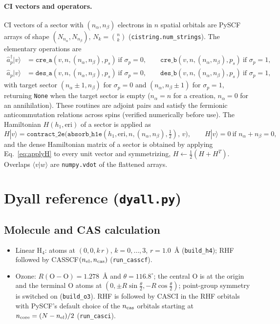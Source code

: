 \documentclass[11pt,a4paper]{article}
\newcommand{\ket}[1]{|#1\rangle}
\newcommand{\braket}[1]{\langle#1\rangle}
\newcommand{\code}[1]{\texttt{#1}}
\begin{document}
\paragraph{CI vectors and operators.}
CI vectors of a sector with $(n_\alpha,n_\beta)$ electrons in $n$ spatial
orbitals are PySCF arrays of shape $(N_{n_\alpha},N_{n_\beta})$,
$N_k=\binom{n}{k}$ (\code{cistring.num\_strings}).  The elementary
operations are
\begin{align}
  \hat a_p^\dagger\ket{v}&=\code{cre\_a}(v,n,(n_\alpha,n_\beta),p_s)\ \text{if }\sigma_p=0,\qquad
  \code{cre\_b}(v,n,(n_\alpha,n_\beta),p_s)\ \text{if }\sigma_p=1,
  \label{eq:cre}\\
  \hat a_p\ket{v}&=\code{des\_a}(v,n,(n_\alpha,n_\beta),p_s)\ \text{if }\sigma_p=0,\qquad
  \code{des\_b}(v,n,(n_\alpha,n_\beta),p_s)\ \text{if }\sigma_p=1,
  \label{eq:des}
\end{align}
with target sector $(n_\alpha{\pm}1,n_\beta)$ for $\sigma_p=0$ and
$(n_\alpha,n_\beta{\pm}1)$ for $\sigma_p=1$, returning \code{None} when the
target sector is empty ($n_\alpha=n$ for a
creation, $n_\alpha=0$ for an annihilation).  These routines are adjoint
pairs and satisfy the fermionic anticommutation relations across spins
(verified numerically before use).  The Hamiltonian $H(h_1,\mathrm{eri})$ of
a sector is applied as
\begin{equation}
  H\ket{v}=\code{contract\_2e}\bigl(\code{absorb\_h1e}(h_1,\mathrm{eri},n,(n_\alpha,n_\beta),\tfrac12),\,v\bigr),
  \qquad H\ket{v}=0\ \text{if }n_\alpha+n_\beta=0,
  \label{eq:applyH}
\end{equation}
and the dense Hamiltonian matrix of a sector is obtained by applying
Eq.~\eqref{eq:applyH} to every unit vector and symmetrizing,
$H\leftarrow\tfrac12(H+H^{T})$.  Overlaps $\braket{v|w}$ are
\code{numpy.vdot} of the flattened arrays.

\section{Dyall reference (\code{dyall.py})}
\label{sec:dyall}

\subsection{Molecule and CAS calculation}
\begin{itemize}[leftmargin=2em]
\item Linear H$_4$: atoms at $(0,0,k\,r)$, $k=0,\ldots,3$, $r=1.0$~\AA{}
  (\code{build\_h4}); RHF followed by CASSCF$(n_{\rm el},n_{\rm cas})$
  (\code{run\_casscf}).
\item Ozone: $R(\mathrm{O{-}O})=1.278$~\AA{} and $\theta=116.8^\circ$; the
  central O is at the origin and the terminal O atoms at
  $(0,\pm R\sin\frac{\theta}{2},-R\cos\frac{\theta}{2})$; point-group
  symmetry is switched on (\code{build\_o3}).  RHF is followed by CASCI in
  the RHF orbitals with PySCF's default choice of the $n_{\rm cas}$ orbitals
  starting at $n_{\rm core}=(N-n_{\rm el})/2$ (\code{run\_casci}).
\end{itemize}
\end{document}

